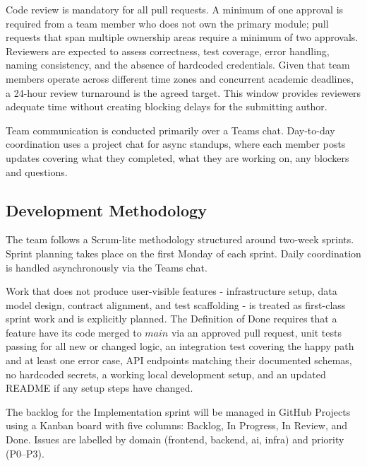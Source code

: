 \documentclass{article}
\begin{document}
\hspace{1cm}

Code review is mandatory for all pull requests. A minimum of one approval is required from a team member who does not own the primary module; pull requests that span multiple ownership areas require a minimum of two approvals. Reviewers are expected to assess correctness, test coverage, error handling, naming consistency, and the absence of hardcoded credentials. Given that team members operate across different time zones and concurrent academic deadlines, a 24-hour review turnaround is the agreed target. This window provides reviewers adequate time without creating blocking delays for the submitting author.


\hspace{1cm}

Team communication is conducted primarily over a Teams chat. Day-to-day coordination uses a project chat for async standups, where each member posts updates covering what they completed, what they are working on, any blockers and questions.

\subsection{Development Methodology}
The team follows a Scrum-lite methodology structured around two-week sprints. Sprint planning takes place on the first Monday of each sprint. Daily coordination is handled asynchronously via the Teams chat.
\newline

Work that does not produce user-visible features - infrastructure setup, data model design, contract alignment, and test scaffolding - is treated as first-class sprint work and is explicitly planned. The Definition of Done requires that a feature have its code merged to $main$ via an approved pull request, unit tests passing for all new or changed logic, an integration test covering the happy path and at least one error case, API endpoints matching their documented schemas, no hardcoded secrets, a working local development setup, and an updated README if any setup steps have changed.
\newline

The backlog for the Implementation sprint will be managed in GitHub Projects using a Kanban board with five columns: Backlog, In Progress, In Review, and Done. Issues are labelled by domain (frontend, backend, ai, infra) and priority (P0–P3).
\end{document}
